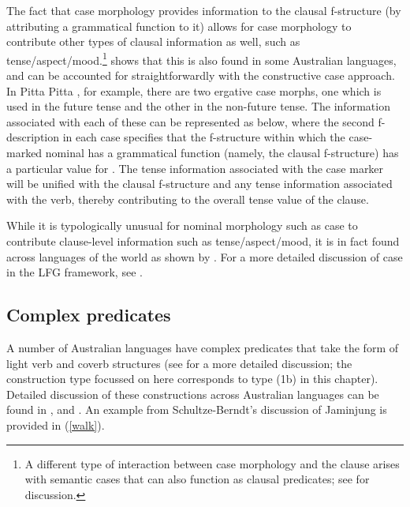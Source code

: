 \documentclass[output=paper,hidelinks]{langscibook}
\begin{document}
\largerpage[2]
The fact that case morphology provides information to the clausal f-structure (by attributing a grammatical function to it) allows for case morphology to contribute other types of clausal information as well, such as tense{\slash}aspect{\slash}mood.\footnote{A different type of interaction between case morphology and the clause arises with semantic cases that can also function as clausal predicates; see \citet{Simpson1991} for discussion.}  \citet[Chapter 4]{nordlinger1998constructive} shows that this is also found in some Australian languages, and can be accounted for straightforwardly with the constructive case approach. In Pitta Pitta \citep{Blake87}, for example, there are two ergative case morphs, one which is used in the future tense and the other in the non-future tense. The information associated with each of these can be represented as below, where the second f-description in each case specifies that the f-structure within which the case-marked nominal has a grammatical function (namely, the clausal f-structure) has a particular value for \TENSE. The tense information associated with the case marker will be unified with the clausal f-structure and any tense information associated with the verb, thereby contributing to the overall tense value of the clause.


\ea
{}
\z

\ea
{}
\z

While it is typologically unusual for nominal morphology such as case to contribute clause-level information such as tense{\slash}aspect{\slash}mood, it is in fact found across languages of the world as shown by \citet{NordSadlLanguage,NordSadlNLLT}.  For a more detailed discussion of case in the LFG framework, see .


\largerpage[2]
\subsection{Complex predicates}
\label{sec:complex-pred}
A number of Australian languages have complex predicates that take the form of light verb and coverb structures (see  for a more detailed discussion; the construction type focussed on here corresponds to type (1b) in this chapter). Detailed discussion of these constructions across Australian languages can be found in \citet{Schulze-Berndt2000}, \citet{McGregor00} and \citet{Bowern14}. An example from Schultze-Berndt's discussion of Jaminjung is provided in (\ref{walk}).
\end{document}
